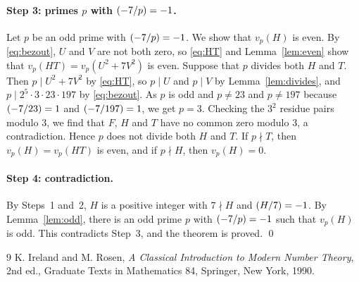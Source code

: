 \documentclass[11pt]{article}
\newcommand{\leg}[2]{\mathchoice{\biggl(\dfrac{#1}{#2}\biggr)}{(#1/#2)}{(#1/#2)}{(#1/#2)}}
\begin{document}
\paragraph{\texorpdfstring{Step 3: primes $p$ with $\leg{-7}{p}=-1$.}{Step 3: inert primes.}} Let $p$ be an odd prime with $\leg{-7}{p}=-1$. We show that $v_p(H)$ is even. By \eqref{eq:bezout}, $U$ and $V$ are not both zero, so \eqref{eq:HT} and Lemma~\ref{lem:even} show that $v_p(HT)=v_p(U^2+7V^2)$ is even. Suppose that $p$ divides both $H$ and $T$. Then $p\mid U^2+7V^2$ by \eqref{eq:HT}, so $p\mid U$ and $p\mid V$ by Lemma~\ref{lem:divides}, and $p\mid 2^{5}\cdot 3\cdot 23\cdot 197$ by \eqref{eq:bezout}. As $p$ is odd and $p\neq23$ and $p\neq197$ because $\leg{-7}{23}=1$ and $\leg{-7}{197}=1$, we get $p=3$. Checking the $3^2$ residue pairs modulo $3$, we find that $F$, $H$ and $T$ have no common zero modulo $3$, a contradiction. Hence $p$ does not divide both $H$ and $T$. If $p\nmid T$, then $v_p(H)=v_p(HT)$ is even, and if $p\nmid H$, then $v_p(H)=0$.

\paragraph{Step 4: contradiction.} By Steps~1 and~2, $H$ is a positive integer with $7\nmid H$ and $\leg{H}{7}=-1$. By Lemma~\ref{lem:odd}, there is an odd prime $p$ with $\leg{-7}{p}=-1$ such that $v_p(H)$ is odd. This contradicts Step~3, and the theorem is proved.
\qed

\begin{thebibliography}{9}
 K. Ireland and M. Rosen, \emph{A Classical Introduction to Modern Number Theory}, 2nd ed., Graduate Texts in Mathematics 84, Springer, New York, 1990.
\end{thebibliography}
\end{document}
